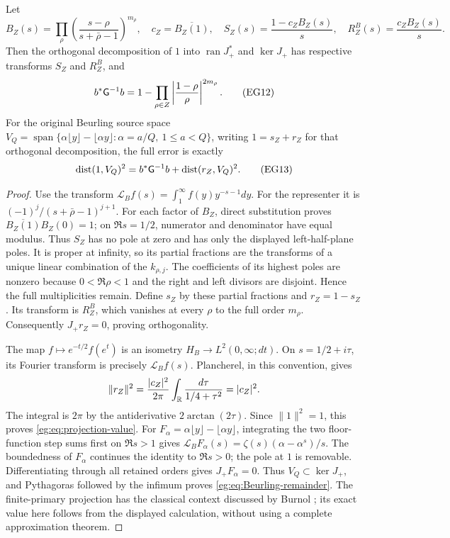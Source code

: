 \begin{egtheorem}\label{eg:thm:projection}
Let
\[
 B_Z(s)=\prod_\rho\left(\frac{s-\rho}{s+\bar\rho-1}\right)^{m_\rho},
 \quad c_Z=\overline{B_Z(1)},\quad
 S_Z(s)=\frac{1-c_ZB_Z(s)}s,\quad R_Z^B(s)=\frac{c_ZB_Z(s)}s.
 \tag{EG11}\label{eg:eq:Blaschke}
\]
Then the orthogonal decomposition of $1$ into $\operatorname{ran}J_+^*$
and $\ker J_+$ has respective transforms $S_Z$ and $R_Z^B$, and
\[
 b^*\mathsf G^{-1}b=1-\prod_{\rho\in Z}
                   \left|\frac{1-\rho}{\rho}\right|^{2m_\rho}.
 \tag{EG12}\label{eg:eq:projection-value}
\]
For the original Beurling source space
$V_Q=\operatorname{span}\{\alpha\lfloor y\rfloor-\lfloor\alpha y\rfloor:
\alpha=a/Q,\ 1\le a<Q\}$, writing $1=s_Z+r_Z$ for that orthogonal
decomposition, the full error is exactly
\[
 \operatorname{dist}(1,V_Q)^2=b^*\mathsf G^{-1}b+
                                      \operatorname{dist}(r_Z,V_Q)^2.
 \tag{EG13}\label{eg:eq:Beurling-remainder}
\]
\end{egtheorem}
\begin{proof}
Use the transform $\mathcal L_Bf(s)=\int_1^\infty f(y)y^{-s-1}dy$.
For the representer it is $(-1)^j/(s+\bar\rho-1)^{j+1}$.
For each factor of $B_Z$, direct substitution proves
$\overline{B_Z(1)}B_Z(0)=1$; on $\Re s=1/2$, numerator and
denominator have equal modulus. Thus $S_Z$ has no pole at zero and
has only the displayed left-half-plane poles. It is proper at
infinity, so its partial fractions are the transforms of a unique
linear combination of the $k_{\rho,j}$. The coefficients of its
highest poles are nonzero because $0<\Re\rho<1$ and the right and
left divisors are disjoint. Hence the full multiplicities remain.
Define $s_Z$ by these partial fractions and $r_Z=1-s_Z$. Its
transform is $R_Z^B$, which vanishes at every $\rho$ to the full
order $m_\rho$. Consequently $J_+r_Z=0$, proving orthogonality.

The map $f\mapsto e^{-t/2}f(e^t)$ is an isometry
$H_B\to L^2(0,\infty;dt)$. On $s=1/2+i\tau$, its Fourier transform
is precisely $\mathcal L_Bf(s)$. Plancherel, in this convention,
gives
\[
 \|r_Z\|^2=\frac{|c_Z|^2}{2\pi}
                  \int_\mathbb R\frac{d\tau}{1/4+\tau^2}=|c_Z|^2.
\]
The integral is $2\pi$ by the antiderivative $2\arctan(2\tau)$.
Since $\|1\|^2=1$, this proves \eqref{eg:eq:projection-value}.
For $F_\alpha=\alpha\lfloor y\rfloor-\lfloor\alpha y\rfloor$,
integrating the two floor-function step sums first on $\Re s>1$
gives $\mathcal L_BF_\alpha(s)=\zeta(s)(\alpha-\alpha^s)/s$.
The boundedness of $F_\alpha$ continues the identity to $\Re s>0$;
the pole at $1$ is removable. Differentiating through all retained
orders gives $J_+F_\alpha=0$. Thus $V_Q\subset\ker J_+$, and
Pythagoras followed by the infimum proves \eqref{eg:eq:Beurling-remainder}.
The finite-primary projection has the classical context discussed
by Burnol \cite{eg:Burnol}; its exact value here follows from the
displayed calculation, without using a complete approximation theorem.
\end{proof}


